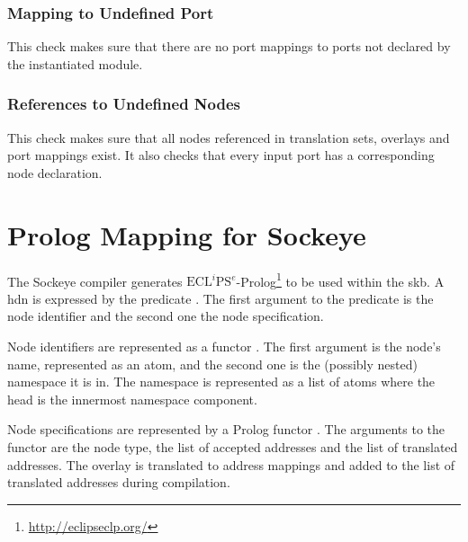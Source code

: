 \documentclass[a4paper,11pt,twoside]{report}
\begin{document}
{{{\subsection{Mapping to Undefined Port}
This check makes sure that there are no port mappings to ports not declared by the instantiated module.

\subsection{References to Undefined Nodes}
This check makes sure that all nodes referenced in translation sets, overlays and port mappings exist.
It also checks that every input port has a corresponding node declaration.


\chapter{Prolog Mapping for Sockeye}
\label{chap:prolog}

The Sockeye compiler generates \(\text{ECL}^i\text{PS}^e\)-Prolog\footnote{\href{http://eclipseclp.org/}{http://eclipseclp.org/}} to be used within the \gls{skb}.
A \gls{hdn} is expressed by the predicate .
The first argument to the predicate is the node identifier and the second one the node specification.

Node identifiers are represented as a functor .
The first argument is the node's name, represented as an atom, and the second one is the (possibly nested) namespace it is in.
The namespace is represented as a list of atoms where the head is the innermost namespace component.

Node specifications are represented by a Prolog functor .
The arguments to the functor are the node type, the list of accepted addresses and the list of translated addresses.
The overlay is translated to address mappings and added to the list of translated addresses during compilation.

}}}
\end{document}
